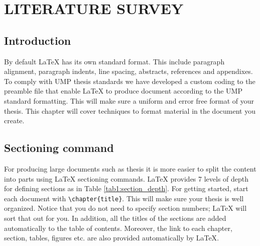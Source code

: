 \chapter{LITERATURE SURVEY}

\section{Introduction}

By default {\LaTeX} has its own standard format. This include paragraph alignment, paragraph indents, line spacing, abstracts, references and appendixes.  To comply with UMP thesis standards we have developed a custom coding to the preamble file that enable {\LaTeX} to produce  document according to the UMP standard formatting. This will make sure a uniform and error free format of your thesis. This chapter will cover techniques to format material in the document you create.

\section{Sectioning command}

For producing large documents such as thesis it is more easier to split the content into parts using {\LaTeX} sectioning commands. {\LaTeX} provides 7 levels of depth for defining sections as in Table \ref{tab1:section_depth}. For getting started, start each document with \verb+\chapter{title}+. This will make sure your thesis is well organized. Notice that you do not need to specify section numbers; LaTeX will sort that out for you. In addition, all the titles of the sections are added automatically to the table of contents. Moreover, the link to each chapter, section, tables, figures etc. are also provided automatically by {\LaTeX}.


